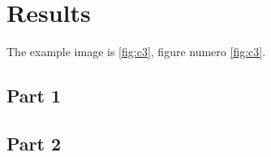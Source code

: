 \section{Results}
\lipsum[1]

\newpage


The example image is \cref{fig:c3}, figure numero \ref{fig:c3}.

\subsection{Part 1}
\lipsum[1]

\subsection{Part 2}
\lipsum[1]
